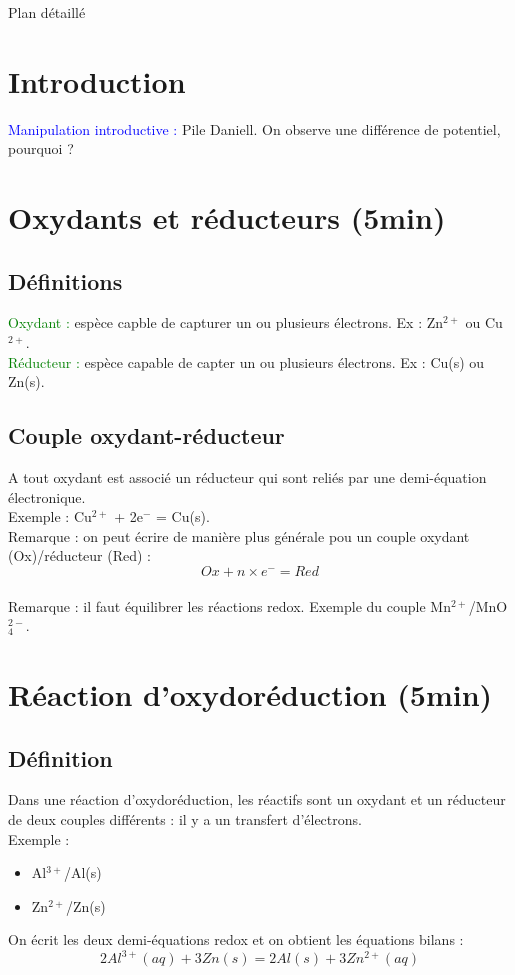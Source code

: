 \begin{reportBlock}{Plan détaillé}
\section*{Introduction }
\textcolor{blue}{Manipulation introductive :} Pile Daniell. On observe une différence de potentiel, pourquoi ?
\section{Oxydants et réducteurs (5min)}

\subsection{Définitions}
\textcolor{green}{Oxydant :} espèce capble de capturer un ou plusieurs électrons. Ex : Zn$^{2+}$ ou Cu$^{2+}$.\\
\textcolor{green}{Réducteur :} espèce capable de capter un ou plusieurs électrons. Ex : Cu(s) ou Zn(s).

\subsection{Couple oxydant-réducteur}
A tout oxydant est associé un réducteur qui sont reliés par une demi-équation électronique.\\
Exemple : Cu$^{2+}$ + 2e$^-$ = Cu(s).\\

Remarque : on peut écrire de manière plus générale pou un couple oxydant (Ox)/réducteur (Red) :
\begin{equation}
    Ox + n\times e^- = Red
\end{equation}
\\
Remarque : il faut équilibrer les réactions redox. Exemple du couple Mn$^{2+}$/MnO$_4^{2-}$.

\section{Réaction d'oxydoréduction (5min)}
\subsection{Définition}
Dans une réaction d'oxydoréduction, les réactifs sont un oxydant et un réducteur de deux couples différents : il y a un transfert d'électrons.\\

Exemple : \begin{itemize}
    \item Al$^{3+}$/Al(s)
    \item Zn$^{2+}$/Zn(s)
\end{itemize}
On écrit les deux demi-équations redox et on obtient les équations bilans :
\begin{equation}
    2Al^{3+}(aq) + 3Zn(s) = 2Al(s) + 3Zn^{2+}(aq)
\end{equation}


\end{reportBlock}
